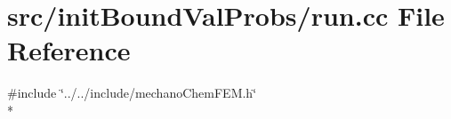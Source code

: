 \section{src/init\-Bound\-Val\-Probs/run.cc File Reference}
\label{run_8cc}
{\ttfamily \#include \char`\"{}../../include/mechano\-Chem\-F\-E\-M.\-h\char`\"{}}\\*
